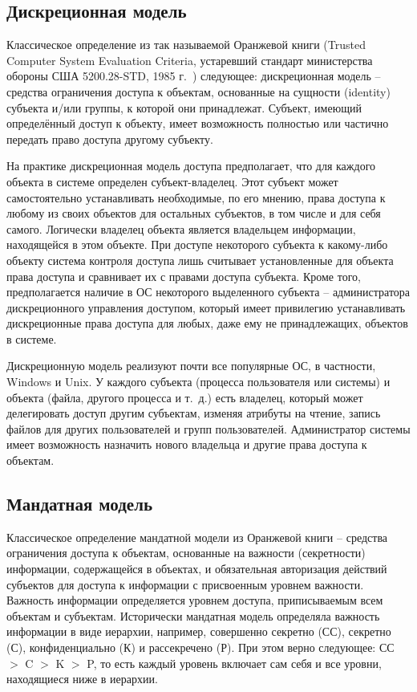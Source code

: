 \subsection{Дискреционная модель}

Классическое определение из так называемой Оранжевой книги (Trusted Computer System Evaluation Criteria, устаревший стандарт министерства обороны США 5200.28-STD, 1985 г.~\cite{DOD-5200.28-STD}) следующее: дискреционная модель -- средства ограничения доступа к объектам, основанные на сущности (identity) субъекта и/или группы, к которой они принадлежат. Субъект, имеющий определённый доступ к объекту, имеет возможность полностью или частично передать право доступа другому субъекту.

На практике дискреционная модель доступа предполагает, что для каждого объекта в системе определен субъект-владелец. Этот субъект может самостоятельно устанавливать необходимые, по его мнению, права доступа к любому из своих объектов для остальных субъектов, в том числе и для себя самого. Логически владелец объекта является владельцем информации, находящейся в этом объекте. При доступе некоторого субъекта к какому-либо объекту система контроля доступа лишь считывает установленные для объекта права доступа и сравнивает их с правами доступа субъекта. Кроме того, предполагается наличие в ОС некоторого выделенного субъекта -- администратора дискреционного управления доступом, который имеет привилегию устанавливать дискреционные права доступа для любых, даже ему не принадлежащих, объектов в системе.

Дискреционную модель реализуют почти все популярные ОС, в частности, Windows и Unix. У каждого субъекта (процесса пользователя или системы) и объекта (файла, другого процесса и т.~д.) есть владелец, который может делегировать доступ другим субъектам, изменяя атрибуты на чтение, запись файлов для других пользователей и групп пользователей. Администратор системы имеет возможность назначить нового владельца и другие права доступа к объектам.


\subsection{Мандатная модель}

Классическое определение мандатной модели из Оранжевой книги -- средства ограничения доступа к объектам, основанные на важности (секретности) информации, содержащейся в объектах, и обязательная авторизация действий субъектов для доступа к информации с присвоенным уровнем важности. Важность информации определяется уровнем доступа, приписываемым всем объектам и субъектам. Исторически мандатная модель определяла важность информации в виде иерархии, например, совершенно секретно (СС), секретно (С), конфиденциально (К) и рассекречено (Р). При этом верно следующее: СС $>$ C $>$ K $>$ P, то есть каждый уровень включает сам себя и все уровни, находящиеся ниже в иерархии.


